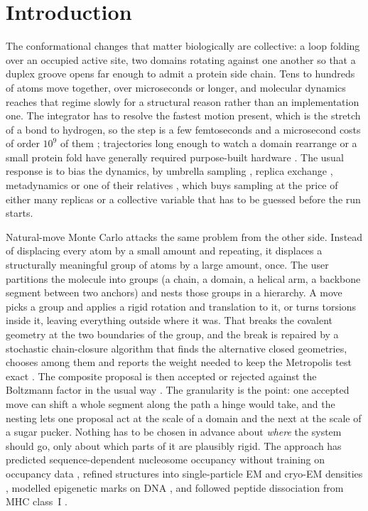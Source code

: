 \section{Introduction}
\label{sec:introduction}

The conformational changes that matter biologically are collective: a loop
folding over an occupied active site, two domains rotating against one another
so that a duplex groove opens far enough to admit a protein side chain. Tens to
hundreds of atoms move together, over microseconds or longer, and molecular
dynamics reaches that regime slowly for a structural reason rather than an
implementation one. The integrator has to resolve the fastest motion present,
which is the stretch of a bond to hydrogen, so the step is a few femtoseconds
and a microsecond costs of order $10^{9}$ of them \cite{dror2012microscope};
trajectories long enough to watch a domain rearrange or a small protein fold
have generally required purpose-built hardware
\cite{shaw2010anton,lindorfflarsen2011folding}. The usual response is to bias
the dynamics, by umbrella sampling \cite{torrie1977umbrella}, replica exchange
\cite{sugita1999remd}, metadynamics \cite{laio2002metadynamics} or one of their
relatives \cite{bernardi2015enhanced}, which buys sampling at the price of
either many replicas or a collective variable that has to be guessed before the
run starts.

Natural-move Monte Carlo attacks the same problem from the other side. Instead
of displacing every atom by a small amount and repeating, it displaces a
structurally meaningful group of atoms by a large amount, once. The user
partitions the molecule into groups (a chain, a domain, a helical arm, a
backbone segment between two anchors) and nests those groups in a hierarchy. A
move picks a group and applies a rigid rotation and translation to it, or turns
torsions inside it, leaving everything outside where it was. That breaks the
covalent geometry at the two boundaries of the group, and the break is repaired
by a stochastic chain-closure algorithm that finds the alternative closed
geometries, chooses among them and reports the weight needed to keep the
Metropolis test exact \cite{minary2010chainclosure}. The composite proposal is
then accepted or rejected against the Boltzmann factor in the usual way
\cite{sim2012naturalmoves}. The granularity is the point: one accepted move can
shift a whole segment along the path a hinge would take, and the nesting lets
one proposal act at the scale of a domain and the next at the scale of a sugar
pucker. Nothing has to be chosen in advance about \emph{where} the system should
go, only about which parts of it are plausibly rigid. The approach has predicted
sequence-dependent nucleosome occupancy without training on occupancy data
\cite{minary2014nucleosome}, refined structures into single-particle EM and
cryo-EM densities \cite{zhang2012multiscale,chang2020rnacryoem}, modelled
epigenetic marks on DNA \cite{krawczyk2018epigenetic}, and followed peptide
dissociation from MHC class~I \cite{knapp2016pmhc}.

